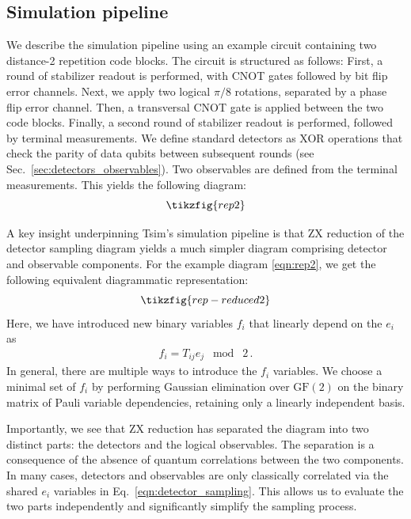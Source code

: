 \documentclass[
  a4paper,
  onecolumn,
  11pt,
  allowtoday
]{quantumarticle}
\newcommand{\FF}{\mathrm{GF}(2)}
\begin{document}
\subsection{Simulation pipeline}

We describe the simulation pipeline using an example circuit containing two distance-2 repetition code blocks. The circuit is structured as follows: First, a round of stabilizer readout is performed, with CNOT gates followed by bit flip error channels. Next, we apply two logical $\pi/8$ rotations, separated by a phase flip error channel. Then, a transversal CNOT gate is applied between the two code blocks. Finally, a second round of stabilizer readout is performed, followed by terminal measurements. We define standard detectors as XOR operations
that check the parity of data qubits between subsequent rounds (see Sec.~\ref{sec:detectors_observables}). Two observables
are defined from the terminal measurements. This yields the following diagram:
\begin{equation}
  \tikzfig{rep2}
  \label{eqn:rep2}
\end{equation}

A key insight underpinning Tsim's simulation pipeline is that ZX reduction
of the detector sampling diagram yields a
much simpler diagram comprising detector and observable components.
For the example diagram \eqref{eqn:rep2}, we get the following equivalent diagrammatic representation:
\begin{equation}
  \tikzfig{rep-reduced2}
  \label{eqn:rep_reduced2}
\end{equation}
Here, we have introduced new binary variables $f_i$
that linearly depend on the $e_i$ as
\begin{align}
  f_i = T_{ij} e_j \;\bmod\; 2 \, .
  \label{eqn:detector_sampling}
\end{align}
In general, there are multiple ways to introduce the $f_i$ variables. We choose a minimal set of $f_i$ by performing Gaussian elimination over $\FF$ on the binary matrix of Pauli variable dependencies, retaining only a linearly independent basis.

Importantly, we see that ZX reduction has separated the diagram into two distinct parts: the detectors and the logical observables. The separation is a consequence of the absence
of quantum correlations between the two components.
In many cases, detectors and observables are only classically correlated via
the shared $e_i$ variables in Eq.~\eqref{eqn:detector_sampling}.
This allows us to evaluate the two parts independently and significantly
simplify the sampling process.
\end{document}
